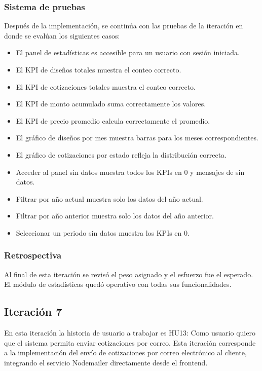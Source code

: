 ﻿\documentclass{iccmemoria}
\begin{document}
\subsubsection{Sistema de pruebas}
Después de la implementación, se continúa con las pruebas de la iteración en donde se evalúan los siguientes casos:
\begin{itemize}
    \item El panel de estadísticas es accesible para un usuario con sesión iniciada.
    \item El KPI de diseños totales muestra el conteo correcto.
    \item El KPI de cotizaciones totales muestra el conteo correcto.
    \item El KPI de monto acumulado suma correctamente los valores.
    \item El KPI de precio promedio calcula correctamente el promedio.
    \item El gráfico de diseños por mes muestra barras para los meses correspondientes.
    \item El gráfico de cotizaciones por estado refleja la distribución correcta.
    \item Acceder al panel sin datos muestra todos los KPIs en 0 y mensajes de sin datos.
    \item Filtrar por año actual muestra solo los datos del año actual.
    \item Filtrar por año anterior muestra solo los datos del año anterior.
    \item Seleccionar un periodo sin datos muestra los KPIs en 0.
\end{itemize}
\subsubsection{Retrospectiva}
Al final de esta iteración se revisó el peso asignado y el esfuerzo fue el esperado. El módulo de estadísticas quedó operativo con todas sus funcionalidades.

\subsection{Iteración 7}
En esta iteración la historia de usuario a trabajar es HU13: Como usuario quiero que el sistema permita enviar cotizaciones por correo. Esta iteración corresponde a la implementación del envío de cotizaciones por correo electrónico al cliente, integrando el servicio Nodemailer directamente desde el frontend.
\end{document}
